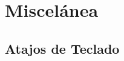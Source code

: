 \documentclass[../../main.tex]{subfiles}
\begin{document}









 \clearpage
\section{Miscelánea}

\subsection{Atajos de Teclado}
\end{document}
